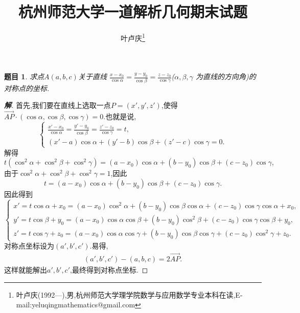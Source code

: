 \documentclass[a4paper]{article}
\newtheorem*{exe}{题目}
\newenvironment{exercise}
{\bigskip\begin{mdframed}\begin{exe}}
    {\end{exe}\end{mdframed}\bigskip}
\newcommand{\ov}{\overrightarrow}
\begin{document}
\title{\huge{\bf{杭州师范大学一道解析几何期末试题}}} \author{\small{叶卢庆\footnote{叶卢庆(1992---),男,杭州师范大学理学院数学与应用数学专业本科在读,E-mail:yeluqingmathematics@gmail.com}}}
\maketitle
\begin{exercise}
  求点$A(a,b,c)$关于直线
  $\frac{x-x_0}{\cos\alpha}=\frac{y-y_0}{\cos\beta}=\frac{z-z_0}{\cos\gamma}$($\alpha,\beta,\gamma$
  为直线的方向角)的对称点的坐标.
\end{exercise}
\begin{proof}[\textbf{解}]
首先,我们要在直线上选取一点$P=(x',y',z')$,使得$\ov{AP}\cdot
(\cos\alpha,\cos\beta,\cos\gamma)=0$.也就是说,
$$
\begin{cases}
  \frac{x'-x_0}{\cos\alpha}=\frac{y'-y_{0}}{\cos\beta}=\frac{z'-z_0}{\cos\gamma}=t,\\
(x'-a)\cos\alpha+(y'-b)\cos\beta+(z'-c)\cos\gamma=0.
\end{cases}
$$
解得
$$
t(\cos^2\alpha+\cos^2\beta+\cos^2\gamma)=(a-x_0)\cos\alpha+(b-y_0)\cos\beta+(c-z_0)\cos\gamma,
$$
由于$\cos^2\alpha+\cos^2\beta+\cos^2\gamma=1$,因此
$$
t=(a-x_0)\cos\alpha+(b-y_0)\cos\beta+(c-z_0)\cos\gamma.
$$
因此得到
$$
\begin{cases}
  x'=t\cos\alpha+x_0=(a-x_0)\cos^{2}\alpha+(b-y_0)\cos\beta\cos\alpha+(c-z_0)\cos\gamma\cos\alpha+x_0,\\
  y'=t\cos\beta+y_0=(a-x_0)\cos\alpha\cos\beta+(b-y_0)\cos^{2}\beta+(c-z_0)\cos\gamma\cos\beta+y_0,\\
z'=t\cos\gamma+z_0=(a-x_0)\cos\alpha\cos\gamma+(b-y_0)\cos\beta\cos\gamma+(c-z_0)\cos^2\gamma+z_0.
\end{cases}
$$
对称点坐标设为$(a',b',c')$.易得,
\begin{align*}
(a',b',c')-(a,b,c)=2\ov{AP}.
\end{align*}
这样就能解出$a',b',c'$,最终得到对称点坐标.
\end{proof}
\end{document}
